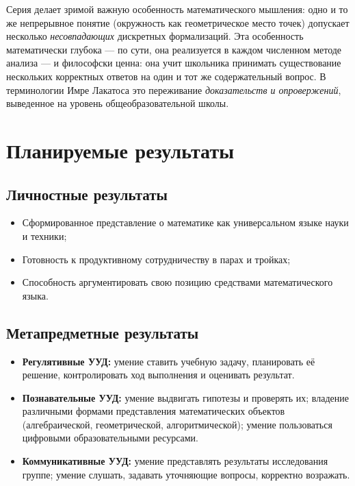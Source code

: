 \documentclass[12pt,a4paper]{scrartcl}
\newcommand{\acc}[1]{\textcolor{accent}{\textbf{#1}}}
\begin{document}
\begin{primechanie}
Серия делает зримой важную особенность математического мышления: одно и то же непрерывное понятие (окружность как геометрическое место точек) допускает несколько \emph{несовпадающих} дискретных формализаций. Эта особенность математически глубока --- по сути, она реализуется в каждом численном методе анализа --- и философски ценна: она учит школьника принимать существование нескольких корректных ответов на один и тот же содержательный вопрос. В терминологии Имре Лакатоса это переживание \emph{доказательств и опровержений}, выведенное на уровень общеобразовательной школы.
\end{primechanie}

\section{Планируемые результаты}

\subsection{Личностные результаты}
\begin{itemize}[leftmargin=1.3em,itemsep=0.15em,topsep=0.3em]
  \item Сформированное представление о математике как универсальном языке науки и техники;
  \item Готовность к продуктивному сотрудничеству в парах и тройках;
  \item Способность аргументировать свою позицию средствами математического языка.
\end{itemize}

\subsection{Метапредметные результаты}
\begin{itemize}[leftmargin=1.3em,itemsep=0.15em,topsep=0.3em]
  \item \acc{Регулятивные УУД:} умение ставить учебную задачу, планировать её решение, контролировать ход выполнения и оценивать результат.
  \item \acc{Познавательные УУД:} умение выдвигать гипотезы и проверять их; владение различными формами представления математических объектов (алгебраической, геометрической, алгоритмической); умение пользоваться цифровыми образовательными ресурсами.
  \item \acc{Коммуникативные УУД:} умение представлять результаты исследования группе; умение слушать, задавать уточняющие вопросы, корректно возражать.
\end{itemize}
\end{document}
